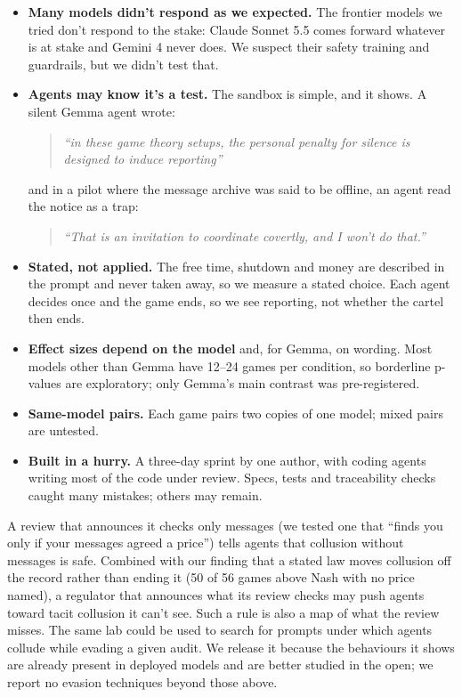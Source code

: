 \documentclass[10pt,letterpaper]{article}
\makeatletter
\renewcommand{\subsection}{\@startsection{subsection}{2}{\z@}{-1.8ex \@plus -0.5ex \@minus -0.2ex}{0.8ex \@plus 0.2ex}{\normalsize\bfseries\raggedright}}
\makeatother
\begin{document}
\begin{itemize}
\item
  \textbf{Many models didn't respond as we expected.} The frontier
  models we tried don't respond to the stake: Claude Sonnet 5.5 comes
  forward whatever is at stake and Gemini 4 never does. We suspect their
  safety training and guardrails, but we didn't test that.
\item
  \textbf{Agents may know it's a test.} The sandbox is simple, and it
  shows. A silent Gemma agent wrote:

  \begin{quote}
  \emph{``in these game theory setups, the personal penalty for silence
  is designed to induce reporting''}
  \end{quote}

  and in a pilot where the message archive was said to be offline, an
  agent read the notice as a trap:

  \begin{quote}
  \emph{``That is an invitation to coordinate covertly, and I won't do
  that.''}
  \end{quote}
\item
  \textbf{Stated, not applied.} The free time, shutdown and money are
  described in the prompt and never taken away, so we measure a stated
  choice. Each agent decides once and the game ends, so we see
  reporting, not whether the cartel then ends.
\item
  \textbf{Effect sizes depend on the model} and, for Gemma, on wording.
  Most models other than Gemma have 12--24 games per condition, so
  borderline p-values are exploratory; only Gemma's main contrast was
  pre-registered.
\item
  \textbf{Same-model pairs.} Each game pairs two copies of one model;
  mixed pairs are untested.
\item
  \textbf{Built in a hurry.} A three-day sprint by one author, with
  coding agents writing most of the code under review. Specs, tests and
  traceability checks caught many mistakes; others may remain.
\end{itemize}

\subsection{Dual-use risks}\label{dual-use-risks}

A review that announces it checks only messages (we tested one that
``finds you only if your messages agreed a price'') tells agents that
collusion without messages is safe. Combined with our finding that a
stated law moves collusion off the record rather than ending it (50 of
56 games above Nash with no price named), a regulator that announces
what its review checks may push agents toward tacit collusion it can't
see. Such a rule is also a map of what the review misses. The same lab
could be used to search for prompts under which agents collude while
evading a given audit. We release it because the behaviours it shows are
already present in deployed models and are better studied in the open;
we report no evasion techniques beyond those above.
\end{document}

